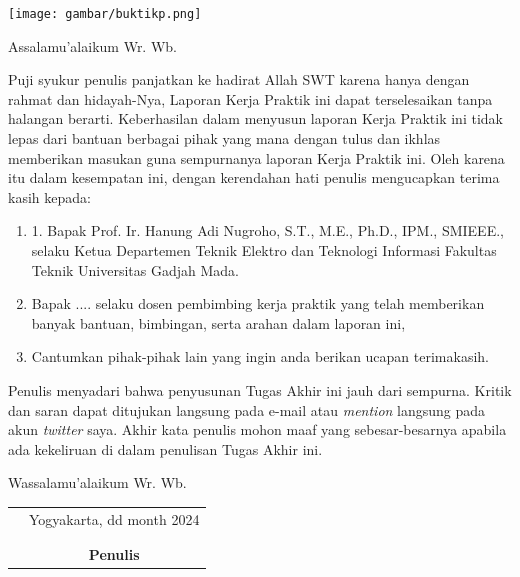 \documentclass{jtetikp}
\begin{document}
\cover

\approvalpage
\BgThispage

\proof
\texttt{[image: gambar/buktikp.png]}

\preface
Assalamu'alaikum Wr. Wb.

\vspace{0.5cm}

Puji syukur penulis panjatkan ke hadirat Allah SWT karena hanya dengan rahmat dan hidayah-Nya, Laporan Kerja Praktik ini dapat terselesaikan tanpa halangan berarti. Keberhasilan dalam menyusun laporan Kerja Praktik ini tidak lepas dari bantuan berbagai pihak yang mana dengan tulus dan ikhlas memberikan masukan guna sempurnanya laporan Kerja Praktik ini. Oleh karena itu dalam kesempatan ini, dengan kerendahan hati penulis mengucapkan terima kasih kepada:

\begin{enumerate}
\item{1.	Bapak Prof. Ir. Hanung Adi Nugroho, S.T., M.E., Ph.D., IPM., SMIEEE., selaku Ketua Departemen Teknik Elektro dan Teknologi Informasi Fakultas Teknik Universitas Gadjah Mada.}
\item{Bapak .... selaku dosen pembimbing kerja praktik yang telah memberikan banyak bantuan, bimbingan, serta arahan dalam laporan ini,}
\item{Cantumkan pihak-pihak lain yang ingin anda berikan ucapan terimakasih.}
\end{enumerate}

Penulis menyadari bahwa penyusunan Tugas Akhir ini jauh dari sempurna. Kritik dan saran dapat ditujukan langsung pada e-mail atau \emph{mention} langsung pada akun \emph{twitter} saya. Akhir kata penulis mohon maaf yang sebesar-besarnya apabila ada kekeliruan di dalam penulisan Tugas Akhir ini.

\vspace{0.5cm}

Wassalamu'alaikum Wr. Wb.

\begin{tabular}{p{7.5cm}c}
&Yogyakarta, dd month 2024\\
&\\
&\\
&\textbf{Penulis}
\end{tabular}
\end{document}
